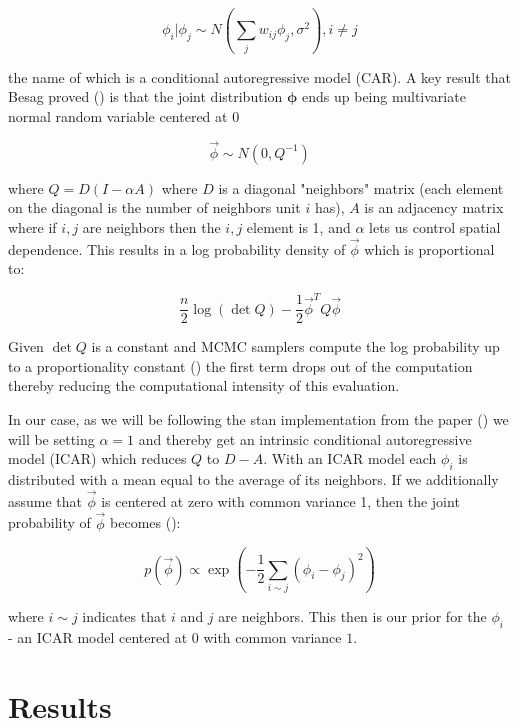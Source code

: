\documentclass[11pt]{article}
\begin{document}
$$\phi_i | \phi_j \sim N\left(\sum_j w_{ij}\phi_j, \sigma^2  \right), i\neq j$$

the name of which is a conditional autoregressive model (CAR). A key result that Besag proved (\cite{besag}) is that the joint distribution $\bm{\phi}$ ends up being multivariate normal random variable centered at 0

$$\vec{\phi}\sim N(0, Q^{-1})$$

where $Q=D(I-\alpha A)$ where $D$ is a diagonal "neighbors" matrix (each element on the diagonal is the number of neighbors unit $i$ has), $A$ is an adjacency matrix where if $i,j$ are neighbors then the $i,j$ element is 1, and $\alpha$ lets us control spatial dependence. This results in a log probability density of $\vec{\phi}$ which is proportional to:

$$\frac{n}{2}\log{(\det{Q})}-\frac{1}{2}\vec{\phi}^T Q \vec{\phi}$$

Given $\det{Q}$ is a constant and MCMC samplers compute the log probability up to a proportionality constant (\cite{bymstan}) the first term drops out of the computation thereby reducing the computational intensity of this evaluation. 

In our case, as we will be following the stan implementation from the paper (\cite{bymstan}) we will be setting $\alpha=1$ and thereby get an intrinsic conditional autoregressive model (ICAR) which reduces $Q$ to $D-A$. With an ICAR model each $\phi_i$ is distributed with a mean equal to the average of its neighbors. If we additionally assume that $\vec{\phi}$ is centered at zero with common variance 1, then the joint probability of $\vec{\phi}$ becomes (\cite{bymstan}):

$$p(\vec{\phi})\propto \exp{\left( -\frac{1}{2} \sum_{i\sim j} (\phi_i - \phi_j)^2 \right)}$$

where $i \sim j$ indicates that $i$ and $j$ are neighbors. This then is our prior for the $\phi_i$ - an ICAR model centered at $0$ with common variance $1$. 


\section{Results}
\end{document}

